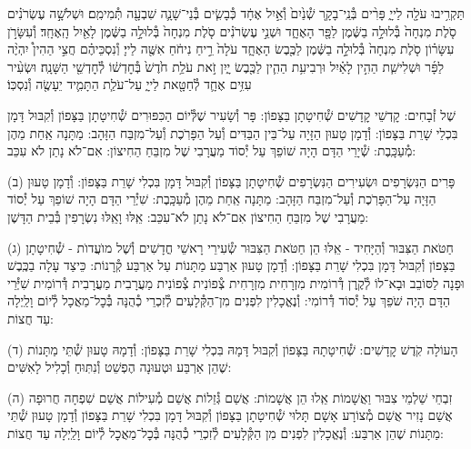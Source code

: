 \documentclass[twoside, openany, parskip=half, 11pt]{book}
\begin{document}
תַּקְרִ֥יבוּ עֹלָ֖ה לַייָ֑ פָּרִ֨ים בְּ֯נֵֽי־בָקָ֤ר שְׁ֯נַ֙יִם֙ וְ֯אַ֣יִל אֶחָ֔ד כְּ֯בָשִׂ֧ים בְּ֯נֵי־שָׁנָ֛ה שִׁבְעָ֖ה תְּ֯מִימִֽם׃
וּשְׁלֹשָׁ֣ה עֶשְׂרֹנִ֗ים סֹ֤לֶת מִנְחָה֙ בְּ֯לוּלָ֣ה בַשֶּׁ֔מֶן לַפָּ֖ר הָאֶחָ֑ד וּשְׁנֵ֣י עֶשְׂרֹנִ֗ים סֹ֤לֶת מִנְחָה֙ בְּ֯לוּלָ֣ה בַשֶּׁ֔מֶן לָאַ֖יִל הָֽאֶחָֽד׃
וְ֯עִשָּׂרֹ֣ן עִשָּׂר֗וֹן סֹ֤לֶת מִנְחָה֙ בְּ֯לוּלָ֣ה בַשֶּׁ֔מֶן לַכֶּ֖בֶשׂ הָאֶחָ֑ד עֹלָה֙ רֵ֣יחַ נִיחֹ֔חַ אִשֶּׁ֖ה לַייָ׃
וְ֯נִסְכֵּיהֶ֗ם חֲצִ֣י הַהִין֩ יִהְיֶ֨ה לַפָּ֜ר וּשְׁלִישִׁ֧ת הַהִ֣ין לָאַ֗יִל וּרְבִיעִ֥ת הַהִ֛ין לַכֶּ֖בֶשׂ יָ֑יִן זֹ֣את עֹלַ֥ת חֹ֙דֶשׁ֙ בְּ֯חׇדְשׁ֔וֹ לְ֯חׇדְשֵׁ֖י הַשָּׁנָֽה׃
וּשְׂעִ֨יר עִזִּ֥ים אֶחָ֛ד לְ֯חַטָּ֖את לַייָ֑ עַל־עֹלַ֧ת הַתָּמִ֛יד יֵעָשֶׂ֖ה וְ֯נִסְכּֽוֹ׃

%
שֶׁל זְ֯בָחִים: קׇדְשֵׁי קׇדָשִׁים שְׁ֯חִיטָתָן בַּצָּפוֹן: פָּר וְ֯שָׂעִיר שֶׁלְּ֯יוֹם הַכִּפּוּרִים שְׁ֯חִיטָתָן בַּצָּפוֹן וְ֯קִבּוּל דָּמָן בִּכְלֵי שָׁרֵת בַּצָּפוֹן: וְ֯דָמָן טָעוּן הַזָּיָה עַל־בֵּין הַבַּדִּים וְ֯עַל הַפָּרֹֽכֶת וְ֯עַל־מִזְבַּח הַזָּהָב: מַתָּנָה אַֽחַת מֵהֶן מְ֯עַכָּֽבֶת: שְׁ֯יָרֵי הַדָּם הָיָה שׁוֹפֵךְ עַל יְ֯סוֹד מַעֲרָבִי שֶׁל מִזְבֵּחַ הַחִיצוֹן: אִם־לֹא נָתַן לֹא עִכֵּב:

(ב) פָּרִים הַנִּשְׂרָפִים וּשְׂעִירִים הַנִּשְׂרָפִים שְׁ֯חִיטָתָן בַּצָּפוֹן וְ֯קִבּוּל דָּמָן בִּכְלִי שָׁרֵת בַּצָּפוֹן: וְ֯דָמָן טָעוּן הַזָּיָה עַל־הַפָּרֹֽכֶת וְ֯עַל־מִזְבַּח הַזָּהָב: מַתָּנָה אַֽחַת מֵהֶן מְ֯עַכָּֽבֶת: שִׁיְ֯רֵי הַדָּם הָיָה שׁוֹפֵךְ עַל יְ֯סוֹד מַעֲרָבִי שֶׁל מִזְבֵּחַ הַחִיצוֹן אִם־לֹא נָתַן לֹא־עִכֵּב: אֵֽלּוּ וָאֵֽלּוּ נִשְׂרָפִין בְּ֯בֵית הַדָּשֶׁן:

(ג) חַטֹּאת הַצִּבּוּר וְ֯הַיָּחִיד - אֵֽלּוּ הֵן חַטֹּאת הַצִּבּוּר שְׂ֯עִירֵי רָאשֵׁי חֳדָשִׁים וְ֯שֶׁל מוׁעֲדוׂת - שְׁ֯חִיטָתָן בַּצָּפוֹן וְ֯קִבּוּל דָּמָן בִּכְלִי שָׁרֵת בַּצָּפוֹן: וְ֯דָמָן טָעוּן אַרְבַּע מַתָּנוֹת עַל אַרְבַּע קְ֯רָנוֹת: כֵּיצַד עָלָה בַכֶּֽבֶשׁ וּפָנָה לַסּוֹבֵב וּבָא־לוֹ לְ֯קֶֽרֶן דְּ֯רוֹמִית מִזְרָחִית מִזְרָחִית צְ֯פוֹנִית צְ֯פוֹנִית מַעֲרָבִית מַעֲרָבִית דְּ֯רוֹמִית שִׁיְּ֯רֵי הַדָּם הָיָה שֹׁפֵךְ עַל יְ֯סוֹד דְּ֯רוֹמִי: וְ֯נֶאֱכָלִין לִפְנִים מִן־הַקְּ֯לָעִים לְ֯זִכְרֵי כְ֯הֻנָּה בְּ֯כׇל־מַאֲכָל לְ֯יוֹם וָלַֽיְלָה עַד חֲצוֹת:

(ד) הָעוֹלָה קֹֽדֶשׁ קׇדָשִׁים: שְׁ֯חִיטָתָהּ בַּצָּפוֹן וְ֯קִבּוּל דָּמָהּ בִּכְלִי שָׁרֵת בַּצָּפוֹן: וְ֯דָמָהּ טָעוּן שְׁ֯תֵּי מַתָּנוֹת שֶׁהֵן אַרְבַּע וּטְעוּנָה הֶפְשֵׁט וְ֯נִתּֽוּחַ וְ֯כָלִיל לָאִשִּׁים:

(ה) זִבְחֵי שַׁלְמֵי צִבּוּר וַאֲשָׁמוֹת אֵֽלוּ הֵן אֲשָׁמוֹת: אֲשַׁם גְּ֯זֵלוֹת אֲשַׁם מְ֯עִילוֹת אֲשַׁם שִׁפְחָה חֲרוּפָה אֲשַׁם נָזִיר אֲשַׁם מְ֯צוֹרָע אָשָׁם תָּלוּי שְׁ֯חִיטָתָן בַּצָּפוֹן וְ֯קִבּוּל דָּמָן בִּכְלִי שָׁרֵת בַּצָּפוֹן וְ֯דָמָן טָעוּן שְׁ֯תֵּי מַתָּנוֹת שֶׁהֵן אַרְבַּע: וְ֯נֶאֱכָלִין לִפְנִים מִן הַקְּ֯לָעִים לְ֯זִכְרֵי כְ֯הֻנָּה בְּ֯כׇל־מַאֲכׇל לְ֯יוֹם וָלַֽיְלָה עַד חֲצוֹת:
\end{document}
